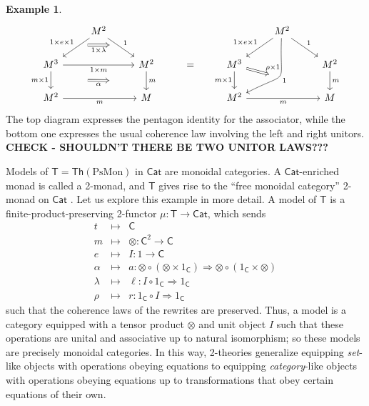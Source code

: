 \documentclass{amsart}
\theoremstyle{definition}
\newtheorem{example}[theorem]{Example}
\newcommand{\Th}{\mathsf{Th}}
\newcommand{\Cat}{\mathsf{Cat}}
\newcommand{\C}{\mathsf{C}}
\newcommand{\T}{\mathsf{T}}
\newcommand{\maps}{\colon}
\begin{document}
\begin{example}
      \[\begin{tikzcd}
          & M^2 \ar[dl,"1\times e\times 1",""name=a1,swap] \ar[dr,"1",""name=a2] \arrow[Rightarrow,from=a1,to=a2,"1\times \lambda",swap,shorten >=0.4cm,shorten <=0.4cm] & && & M^2 \ar[dl,"1\times e\times 1",swap] \ar[dr,"1"] \ar[ddl,bend left =30,looseness=2, "1",""name=c1] & \\
          M^3 \ar[d,"m\times 1",swap,""name=b1] \ar[rr,"1\times m",swap] && M^2 \ar[d,"m",""name=b2] \arrow[Rightarrow,from=b1,to=b2,"\alpha",shorten >=1.3cm,shorten <=1.3cm,swap] & = & M^3 \ar[d,"m\times 1",swap] \arrow[Rightarrow,to=c1,"\rho\times 1",shorten >=0.4cm,shorten <=0.0cm] && M^2 \ar[d,"m"] \\
          M^2 \ar[rr,"m",swap] && M && M^2 \ar[rr,"m",swap] && M
        \end{tikzcd}\]
\noindent The top diagram expresses the pentagon identity for the associator, while the bottom one expresses the usual coherence law involving the left and right unitors.  \textbf{CHECK - SHOULDN'T THERE BE TWO UNITOR LAWS???}
   
Models of $\T = \Th(\mathrm{PsMon})$ in $\Cat$ are monoidal categories.   A $\Cat$-enriched monad is called a 2-monad, and $\T$ gives rise to the ``free monoidal category'' 2-monad on $\Cat$ \cite{bkp}.
Let us explore this example in more detail.  A model of $\T$ is a finite-product-preserving 2-functor $\mu\colon \T\to \Cat$, which sends 
\[\begin{array}{rcc}
	t & \mapsto& \C \\
	m & \mapsto & \otimes\maps  \C^2 \to \C \\
	e & \mapsto & I\maps  1\to \C \\
	\alpha & \mapsto & a \maps  \otimes \circ (\otimes \times 1_\C)  \Rightarrow  \otimes \circ (1_\C \times \otimes)\\
	\lambda & \mapsto & \ell \maps  I\circ 1_\C  \Rightarrow  1_\C\\
	\rho & \mapsto & r \maps  1_\C \circ I  \Rightarrow  1_\C
\end{array}\]
such that the coherence laws of the rewrites are preserved.  Thus, a model is a category equipped with a tensor product $\otimes$ and unit object $I$ such that these operations are unital and associative up to natural isomorphism; so these models are precisely monoidal categories. In this way, 2-theories generalize equipping \textit{set}-like objects  with operations obeying equations to equipping \textit{category}-like objects with operations obeying equations up to 
transformations that obey certain equations of their own.


\end{example}
\end{document}
